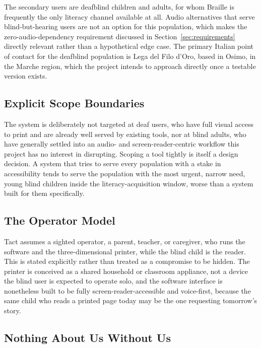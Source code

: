 \documentclass[conference]{IEEEtran}
\begin{document}
The secondary users are deafblind children and adults, for whom Braille is frequently the only literacy channel available at all. Audio alternatives that serve blind-but-hearing users are not an option for this population, which makes the zero-audio-dependency requirement discussed in Section~\ref{sec:requirements} directly relevant rather than a hypothetical edge case. The primary Italian point of contact for the deafblind population is Lega del Filo d'Oro, based in Osimo, in the Marche region, which the project intends to approach directly once a testable version exists.

\subsection{Explicit Scope Boundaries}

The system is deliberately not targeted at deaf users, who have full visual access to print and are already well served by existing tools, nor at blind adults, who have generally settled into an audio- and screen-reader-centric workflow this project has no interest in disrupting. Scoping a tool tightly is itself a design decision. A system that tries to serve every population with a stake in accessibility tends to serve the population with the most urgent, narrow need, young blind children inside the literacy-acquisition window, worse than a system built for them specifically.

\subsection{The Operator Model}

Tact assumes a sighted operator, a parent, teacher, or caregiver, who runs the software and the three-dimensional printer, while the blind child is the reader. This is stated explicitly rather than treated as a compromise to be hidden. The printer is conceived as a shared household or classroom appliance, not a device the blind user is expected to operate solo, and the software interface is nonetheless built to be fully screen-reader-accessible and voice-first, because the same child who reads a printed page today may be the one requesting tomorrow's story.

\subsection{Nothing About Us Without Us}
\end{document}
